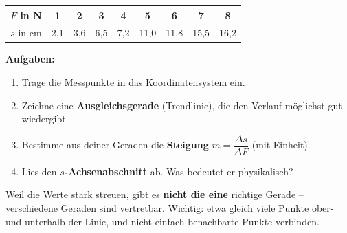 \documentclass[11pt,a4paper]{scrartcl}
\providecommand{\showloesung}{0}
\begin{document}
\begin{center}
\renewcommand{\arraystretch}{1.3}
\begin{tabular}{|c|c|c|c|c|c|c|c|c|}
\hline
$F$ in \si{\newton} & 1 & 2 & 3 & 4 & 5 & 6 & 7 & 8\\\hline
$s$ in \si{\centi\meter} & 2,1 & 3,6 & 6,5 & 7,2 & 11,0 & 11,8 & 15,5 & 16,2\\\hline
\end{tabular}
\end{center}

\textbf{Aufgaben:}
\begin{enumerate}[label=C\arabic*),leftmargin=1.4cm]
\item Trage die Messpunkte in das Koordinatensystem ein.
\item Zeichne eine \textbf{Ausgleichsgerade} (Trendlinie), die den Verlauf möglichst gut wiedergibt.
\item Bestimme aus deiner Geraden die \textbf{Steigung} $m=\dfrac{\Delta s}{\Delta F}$ (mit Einheit).
\item Lies den \textbf{$s$-Achsenabschnitt} ab. Was bedeutet er physikalisch?
\end{enumerate}

\begin{hinweis}
Weil die Werte stark streuen, gibt es \textbf{nicht die eine} richtige Gerade -- verschiedene Geraden sind vertretbar. Wichtig: etwa gleich viele Punkte ober- und unterhalb der Linie, und nicht einfach benachbarte Punkte verbinden.
\end{hinweis}

\vspace{0.3cm}
\begin{center}
\end{center}
\end{document}
